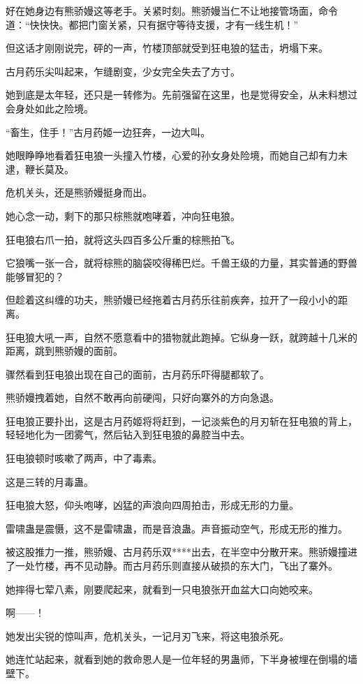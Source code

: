 \begin{this_body}
好在她身边有熊骄嫚这等老手。关紧时刻。熊骄嫚当仁不让地接管场面，命令道：“快快快。都把门窗关紧，只有据守等待支援，才有一线生机！”

但这话才刚刚说完，砰的一声，竹楼顶部就受到狂电狼的猛击，坍塌下来。

古月药乐尖叫起来，乍缝剧变，少女完全失去了方寸。

她到底是太年轻，还只是一转修为。先前强留在这里，也是觉得安全，从未料想过会身处如此之险境。

“畜生，住手！”古月药姬一边狂奔，一边大叫。

她眼睁睁地看着狂电狼一头撞入竹楼，心爱的孙女身处险境，而她自己却有力未逮，鞭长莫及。

危机关头，还是熊骄嫚挺身而出。

她心念一动，剩下的那只棕熊就咆哮着，冲向狂电狼。

狂电狼右爪一拍，就将这头四百多公斤重的棕熊拍飞。

它狼嘴一张一合，就将棕熊的脑袋咬得稀巴烂。千兽王级的力量，其实普通的野兽能够冒犯的？

但趁着这纠缠的功夫，熊骄嫚已经拖着古月药乐往前疾奔，拉开了一段小小的距离。

狂电狼大吼一声，自然不愿意看中的猎物就此跑掉。它纵身一跃，就跨越十几米的距离，跳到熊骄嫚的面前。

骤然看到狂电狼出现在自己的面前，古月药乐吓得腿都软了。

熊骄嫚拽着她，自然不敢再向前硬闯，只好向寨外的方向急退。

狂电狼正要扑出，这是古月药姬将将赶到，一记淡紫色的月刃斩在狂电狼的背上，轻轻地化为一团雾气，然后钻入到狂电狼的鼻腔当中去。

狂电狼顿时咳嗽了两声，中了毒素。

这是三转的月毒蛊。

狂电狼大怒，仰头咆哮，凶猛的声浪向四周拍击，形成无形的力量。

雷啸蛊是震慑，这不是雷啸蛊，而是音浪蛊。声音振动空气，形成无形的推力。

被这股推力一推，熊骄嫚、古月药乐双****出去，在半空中分散开来。熊骄嫚撞进了一处竹楼，再不见动静。而古月药乐则直接从破损的东大门，飞出了寨外。

她摔得七荤八素，刚要爬起来，就看到一只电狼张开血盆大口向她咬来。

啊——！

她发出尖锐的惊叫声，危机关头，一记月刃飞来，将这电狼杀死。

她连忙站起来，就看到她的救命恩人是一位年轻的男蛊师，下半身被埋在倒塌的墙壁下。


\end{this_body}
